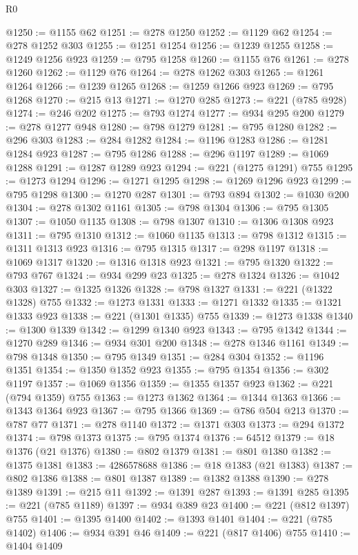 \begin{lexlean}{R0}
\begin{coremodule}
@1250 := @1155 @62
@1251 := @278 @1250
@1252 := @1129 @62
@1254 := @278 @1252 @303
@1255 := @1251 @1254
@1256 := @1239 @1255
@1258 := @1249 @1256 @923
@1259 := @795 @1258
@1260 := @1155 @76
@1261 := @278 @1260
@1262 := @1129 @76
@1264 := @278 @1262 @303
@1265 := @1261 @1264
@1266 := @1239 @1265
@1268 := @1259 @1266 @923
@1269 := @795 @1268
@1270 := @215 @13
@1271 := @1270 @285
@1273 := @221 (@785 @928)
@1274 := @246 @202
@1275 := @793 @1274
@1277 := @934 @295 @200
@1279 := @278 @1277 @948
@1280 := @798 @1279
@1281 := @795 @1280
@1282 := @296 @303
@1283 := @284 @1282
@1284 := @1196 @1283
@1286 := @1281 @1284 @923
@1287 := @795 @1286
@1288 := @296 @1197
@1289 := @1069 @1288
@1291 := @1287 @1289 @923
@1294 := @221 (@1275 @1291) @755
@1295 := @1273 @1294
@1296 := @1271 @1295
@1298 := @1269 @1296 @923
@1299 := @795 @1298
@1300 := @1270 @287
@1301 := @793 @894
@1302 := @1030 @200
@1304 := @278 @1302 @1161
@1305 := @798 @1304
@1306 := @795 @1305
@1307 := @1050 @1135
@1308 := @798 @1307
@1310 := @1306 @1308 @923
@1311 := @795 @1310
@1312 := @1060 @1135
@1313 := @798 @1312
@1315 := @1311 @1313 @923
@1316 := @795 @1315
@1317 := @298 @1197
@1318 := @1069 @1317
@1320 := @1316 @1318 @923
@1321 := @795 @1320
@1322 := @793 @767
@1324 := @934 @299 @23
@1325 := @278 @1324
@1326 := @1042 @303
@1327 := @1325 @1326
@1328 := @798 @1327
@1331 := @221 (@1322 @1328) @755
@1332 := @1273 @1331
@1333 := @1271 @1332
@1335 := @1321 @1333 @923
@1338 := @221 (@1301 @1335) @755
@1339 := @1273 @1338
@1340 := @1300 @1339
@1342 := @1299 @1340 @923
@1343 := @795 @1342
@1344 := @1270 @289
@1346 := @934 @301 @200
@1348 := @278 @1346 @1161
@1349 := @798 @1348
@1350 := @795 @1349
@1351 := @284 @304
@1352 := @1196 @1351
@1354 := @1350 @1352 @923
@1355 := @795 @1354
@1356 := @302 @1197
@1357 := @1069 @1356
@1359 := @1355 @1357 @923
@1362 := @221 (@794 @1359) @755
@1363 := @1273 @1362
@1364 := @1344 @1363
@1366 := @1343 @1364 @923
@1367 := @795 @1366
@1369 := @786 @504 @213
@1370 := @787 @77
@1371 := @278 @1140
@1372 := @1371 @303
@1373 := @294 @1372
@1374 := @798 @1373
@1375 := @795 @1374
@1376 := 64512
@1379 := @18 @1376 (@21 @1376)
@1380 := @802 @1379
@1381 := @801 @1380
@1382 := @1375 @1381
@1383 := 4286578688
@1386 := @18 @1383 (@21 @1383)
@1387 := @802 @1386
@1388 := @801 @1387
@1389 := @1382 @1388
@1390 := @278 @1389
@1391 := @215 @11
@1392 := @1391 @287
@1393 := @1391 @285
@1395 := @221 (@785 @1189)
@1397 := @934 @389 @23
@1400 := @221 (@812 @1397) @755
@1401 := @1395 @1400
@1402 := @1393 @1401
@1404 := @221 (@785 @1402)
@1406 := @934 @391 @46
@1409 := @221 (@817 @1406) @755
@1410 := @1404 @1409

\end{coremodule}
\end{lexlean}
